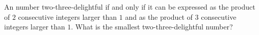 An number two-three-delightful if and only if it can be expressed as the product of $2$ consecutive integers larger than $1$ and as the product of $3$ consecutive integers larger than $1$. What is the smallest two-three-delightful number?
